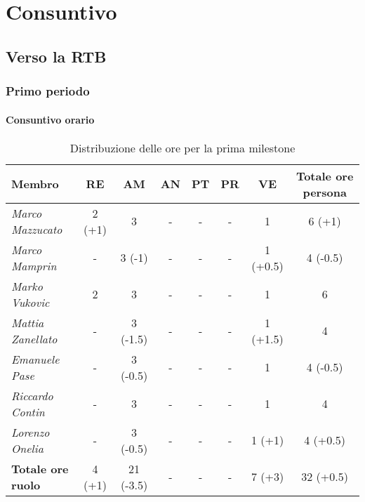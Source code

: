 \chapter{Consuntivo}

\section{Verso la RTB}

\subsection{Primo periodo}

\subsubsection{Consuntivo orario}
\begin{table}[!ht]
    \centering
    \begin{tabular}{|l|c|c|c|c|c|c|c|}
    \hline
    \textbf{Membro} & \multicolumn{1}{c|}{\textbf{RE}} & \multicolumn{1}{c|}{\textbf{AM}} & \multicolumn{1}{c|}{\textbf{AN}} & \multicolumn{1}{c|}{\textbf{PT}} & \multicolumn{1}{c|}{\textbf{PR}} & \multicolumn{1}{c|}{\textbf{VE}} & \multicolumn{1}{c|}{\textbf{Totale ore persona}} \\ \hline
    \textit{Marco Mazzucato}  & 2 (+1) & 3        & - & - & - & 1        & 6 (+1)   \\ \hline
    \textit{Marco Mamprin}    & -      & 3 (-1)   & - & - & - & 1 (+0.5) & 4 (-0.5) \\ \hline
    \textit{Marko Vukovic}    & 2      & 3        & - & - & - & 1        & 6        \\ \hline
    \textit{Mattia Zanellato} & -      & 3 (-1.5) & - & - & - & 1 (+1.5) & 4        \\ \hline
    \textit{Emanuele Pase}    & -      & 3 (-0.5) & - & - & - & 1        & 4 (-0.5) \\ \hline
    \textit{Riccardo Contin}  & -      & 3        & - & - & - & 1        & 4        \\ \hline
    \textit{Lorenzo Onelia}   & -      & 3 (-0.5) & - & - & - & 1 (+1)   & 4 (+0.5) \\ \hline
    \textbf{Totale ore ruolo} & 4 (+1) & 21 (-3.5)& - & - & - & 7 (+3)   & 32 (+0.5)\\ \hline
    \end{tabular}
    \caption{Distribuzione delle ore per la prima milestone}
\end{table}

